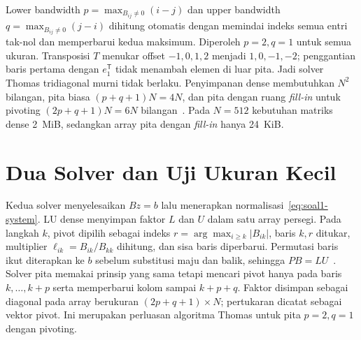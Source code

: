 Lower bandwidth $p=\max_{B_{ij}\ne0}(i-j)$ dan upper bandwidth $q=\max_{B_{ij}\ne0}(j-i)$ dihitung otomatis dengan memindai indeks semua entri tak-nol dan memperbarui kedua maksimum. Diperoleh $p=2,q=1$ untuk semua ukuran. Transposisi $T$ menukar offset $-1,0,1,2$ menjadi $1,0,-1,-2$; penggantian baris pertama dengan $e_1^\mathsf{T}$ tidak menambah elemen di luar pita. Jadi solver Thomas tridiagonal murni tidak berlaku. Penyimpanan dense membutuhkan $N^2$ bilangan, pita biasa $(p+q+1)N=4N$, dan pita dengan ruang \emph{fill-in} untuk pivoting $(2p+q+1)N=6N$ bilangan~\cite{golub,lapack}. Pada $N=512$ kebutuhan matriks dense 2~MiB, sedangkan array pita dengan \emph{fill-in} hanya 24~KiB.

\section{Dua Solver dan Uji Ukuran Kecil}
Kedua solver menyelesaikan $Bz=b$ lalu menerapkan normalisasi~\eqref{eq:soal1-system}. LU dense menyimpan faktor $L$ dan $U$ dalam satu array persegi. Pada langkah $k$, pivot dipilih sebagai indeks $r=\arg\max_{i\ge k}|B_{ik}|$, baris $k,r$ ditukar, multiplier $\ell_{ik}=B_{ik}/B_{kk}$ dihitung, dan sisa baris diperbarui. Permutasi baris ikut diterapkan ke $b$ sebelum substitusi maju dan balik, sehingga $PB=LU$~\cite{heath}. Solver pita memakai prinsip yang sama tetapi mencari pivot hanya pada baris $k,\ldots,k+p$ serta memperbarui kolom sampai $k+p+q$. Faktor disimpan sebagai diagonal pada array berukuran $(2p+q+1)\times N$; pertukaran dicatat sebagai vektor pivot. Ini merupakan perluasan algoritma Thomas untuk pita $p=2,q=1$ dengan pivoting.


